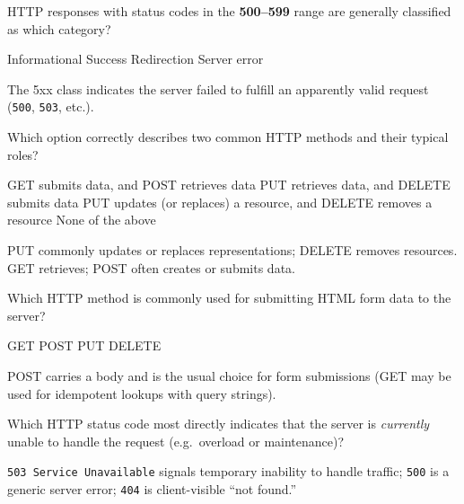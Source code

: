 \newpage

\question[4]
HTTP responses with status codes in the \textbf{500--599} range are generally classified as which category?
\begin{choices}
  \choice Informational
  \choice Success
  \choice Redirection
  \CorrectChoice Server error
\end{choices}
\begin{solution}
  The 5xx class indicates the server failed to fulfill an apparently valid request (\texttt{500}, \texttt{503}, etc.).
\end{solution}

\question[4]
Which option correctly describes two common HTTP methods and their typical roles?
\begin{choices}
  \choice GET submits data, and POST retrieves data
  \choice PUT retrieves data, and DELETE submits data
  \CorrectChoice PUT updates (or replaces) a resource, and DELETE removes a resource
  \choice None of the above
\end{choices}
\begin{solution}
  PUT commonly updates or replaces representations; DELETE removes resources. GET retrieves; POST often creates or submits data.
\end{solution}


\question[4]
Which HTTP method is commonly used for submitting HTML form data to the server?
\begin{choices}
  \choice GET
  \CorrectChoice POST
  \choice PUT
  \choice DELETE
\end{choices}
\begin{solution}
  POST carries a body and is the usual choice for form submissions (GET may be used for idempotent lookups with query strings).
\end{solution}



\question[4]
Which HTTP status code most directly indicates that the server is \emph{currently} unable to handle the request (e.g.\ overload or maintenance)?
\begin{choices}
\end{choices}
\begin{solution}
  \texttt{503 Service Unavailable} signals temporary inability to handle traffic; \texttt{500} is a generic server error; \texttt{404} is client-visible ``not found.''
\end{solution}


